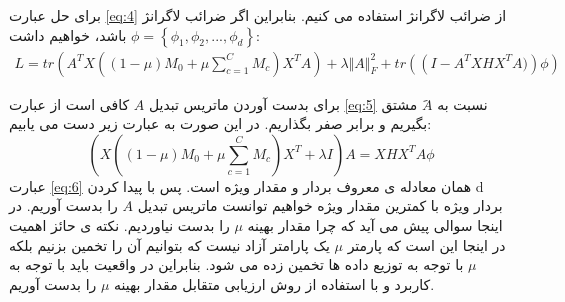 {{{ 		    برای حل عبارت 
 		    \ref{eq:4}
 		    از ضرائب لاگرانژ استفاده می کنیم. بنابراین اگر ضرائب لاگرانژ 
 		    $\phi = \left\lbrace \phi_1, \phi_2, ... , \phi_d \right\rbrace  $
 		    باشد، خواهیم داشت: 
 		    \begin{equation}
 		    	\begin{aligned}
 		    	L = tr \left( A^{T}X \left( \left( 1 - \mu \right) M_{0} + \mu \sum _{c=1\mathrm{ }}^{C}M_{c} \right) X^{T}A \right) + \lambda \Vert A \Vert_{F}^{2} + tr \left( \left( I -  A^{T}XHX^{T}A)\right) \phi \right) 
 		    	\label{eq:5}
 		    	\end{aligned}
 		    \end{equation}
 		    
 		    برای بدست آوردن ماتریس تبدیل $A$ کافی است از عبارت
 		    \ref{eq:5}
 		    نسبت به $َA$ مشتق بگیریم و برابر صفر بگذاریم. در این صورت به عبارت زیر دست می یابیم:
 		    \begin{equation}
 		    	\left( X \left( \left( 1 - \mu \right) M_{0} + \mu \sum _{c=1\mathrm{ }}^{C}M_{c} \right) X^{T} + \lambda I \right) A = XHX^{T}A \phi
 		    	\label{eq:6}
 		    \end{equation}
 		 	عبارت 
 		 	\ref{eq:6}
 		 	همان معادله ی معروف بردار و مقدار ویژه است. پس با پیدا کردن d بردار ویژه با کمترین مقدار ویژه خواهیم توانست ماتریس تبدیل $A$ را بدست آوریم. در اینجا سوالی پیش می آید که چرا مقدار بهینه
 		 	$\mu$
 		 	 را بدست نیاوردیم. نکته ی حائز اهمیت در اینجا این است که پارمتر 
 		 	$\mu$
 		 	 یک پارامتر آزاد نیست که بتوانیم آن را تخمین بزنیم بلکه 
 		 	$\mu$
 		 	 با توجه به توزیع داده ها تخمین زده می شود. بنابراین در واقعیت باید با توجه به کاربرد و با استفاده از روش ارزیابی متقابل مقدار بهینه 
 		 	$\mu$
 		 	 را بدست آوریم.
 		}
}}
